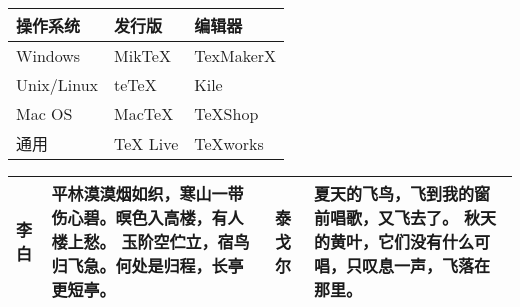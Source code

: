 \documentclass[12pt]{article}
\begin{document}
    \begin{table}[htbp]
        \centering
        \begin{tabular}{p{80pt}>{\centering}p{80pt}>{\raggedleft\arraybackslash}p{80pt}} %
            \toprule
            操作系统 & 发行版 & 编辑器 \\
            \midrule
            Windows & MikTeX & TexMakerX \\
            Unix/Linux & teTeX & Kile \\
            Mac OS & MacTeX & TeXShop \\
            通用 & TeX Live & TeXworks \\
            \bottomrule
        \end{tabular}
    \end{table}
    
    
    \begin{table}[htbp]
        \centering
        \begin{tabularx}{350pt}{l||X|l||X}
            \toprule
            李白 & 平林漠漠烟如织，寒山一带伤心碧。暝色入高楼，有人楼上愁。
            玉阶空伫立，宿鸟归飞急。何处是归程，长亭更短亭。 &
            泰戈尔 & 夏天的飞鸟，飞到我的窗前唱歌，又飞去了。
            秋天的黄叶，它们没有什么可唱，只叹息一声，飞落在那里。 \\
            \bottomrule
        \end{tabularx}
    \end{table}
    
\end{document}
